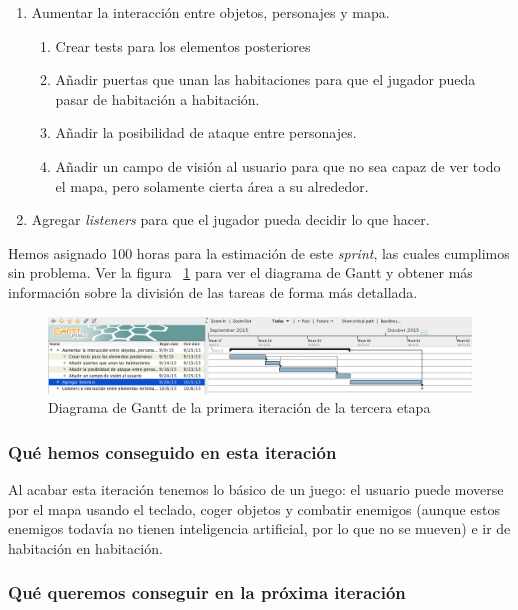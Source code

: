 \begin{enumerate}[label=\bfseries WBS 1.\arabic*]
  \item Aumentar la interacción entre objetos, personajes y mapa.
    \begin{enumerate}[label=\bfseries WBS 1.1.\arabic*]
      \item Crear tests para los elementos posteriores
      \item Añadir puertas que unan las habitaciones para que el jugador pueda pasar de habitación a habitación.
      \item Añadir la posibilidad de ataque entre personajes.
      \item Añadir un campo de visión al usuario para que no sea capaz de ver todo el mapa, pero solamente cierta área a su alrededor.
    \end{enumerate}
  \item Agregar \textit{listeners} para que el jugador pueda decidir lo que hacer.
\end{enumerate}

Hemos asignado 100 horas para la estimación de este \textit{sprint}, las cuales cumplimos sin problema. Ver la figura ~\ref{fig:sec3it1} para ver el diagrama de Gantt y obtener más información sobre la división de las tareas de forma más detallada.

\begin{figure}
    \includegraphics[width=\textwidth,height=\textheight,keepaspectratio]{./img/sec3it1.png}
  \caption{Diagrama de Gantt de la primera iteración de la tercera etapa}
  \label{fig:sec3it1}
\end{figure}

\subsubsection{Qué hemos conseguido en esta iteración}

Al acabar esta iteración tenemos lo básico de un juego: el usuario puede moverse por el mapa usando el teclado, coger objetos y combatir enemigos (aunque estos enemigos todavía no tienen inteligencia artificial, por lo que no se mueven) e ir de habitación en habitación.

\subsubsection{Qué queremos conseguir en la próxima iteración}

